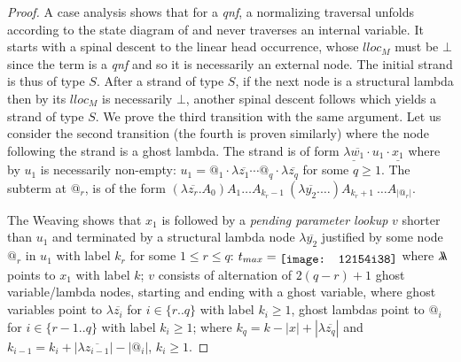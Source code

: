 \documentclass[xchauthor,chkrefs,GCNS,amsmath,amsthm,rotating,leaveRGB]{tcsg}
\theoremstyle{plain}
\theoremstyle{definition}
\newcommand{\ghostlmd}{{\lambda\mkern-7mu \lambda}}
\begin{document}
%
%

\begin{proof}
A case analysis shows that for a \emph{qnf}, a normalizing traversal unfolds
according to the state diagram of
 and never
traverses an internal variable. It starts with a spinal descent to the linear
head occurrence, whose $lloc_{M}$ must be $\bot $ since the term is a
\emph{qnf} and so it is necessarily an external node. The initial strand is
thus of type $S$. After a strand of type $S$, if the next node is a
structural lambda then by  its
$lloc_{M}$ is necessarily $\bot $, another spinal descent follows which
yields a strand of type $S$. We prove the third transition with the same
argument. Let us consider the second transition (the fourth is proven
similarly) where the node following the strand is a ghost lambda. The strand
is of form $\underline{\lambda \overline{w_{1}}} \cdot u_{1} \cdot
\underline{x_{1}} $ where by
 $u_{1}$ is necessarily
non-empty: $u_{1} = @_{1} \cdot \lambda \overline{z_{1}} \cdots @_{q}\cdot
\lambda \overline{z_{q}}$ for some $q\geq 1$. The subterm at $@_{r}$, is of
the form $(\lambda \overline{z_{r}}. A_{0}) A_{1} \ldots A_{k_{r}-1}\
(\lambda \overline{y_{2}}. \ldots )A_{k_{r}+1}\ \ldots A_{|@_{r}|}$.

The Weaving  shows that $x_{1}$ is
followed by a \emph{pending parameter lookup} $v$ shorter than $u_{1}$ and
terminated by a structural lambda node $\lambda \overline{y_{2}}$ justified
by some node $@_{r}$ in $u_{1}$ with label $k_{r}$ for some $1\leq r \leq q$:
$t_{max} = \raisebox{-2pt}{\texttt{[image: 12154i38]}} $ where $\ghostlmd $ points to $x_{1}$
with label $k$; $v$ consists of alternation of $2(q-r) +1$ ghost
variable/lambda nodes, starting and ending with a ghost variable, where ghost
variables point to $\lambda \overline{z_{i}}$ for $i \in \{ r..q \}$ with
label $k_{i}\geq 1$, ghost lambdas point to $@_{i}$ for $i \in \{ r-1..q \}$
with label $k_{i}\geq 1$; where $k_{q} = k - |x| + |\lambda
\overline{z_{q}}|$ and $ k_{i-1} = k_{i} + |\lambda \overline{z_{i-1}}| -
|@_{i}|$, $k_{i}\geq 1$.


\end{proof}
\end{document}

